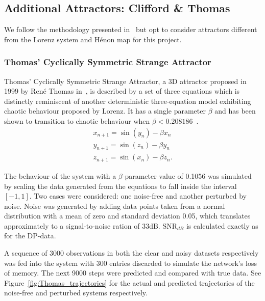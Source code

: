  

\subsection{Additional Attractors: Clifford \& Thomas}
We follow the methodology presented in~\cite{manjunath2021universal} but opt to consider attractors different from the Lorenz system and H\'enon map for this project.

\subsubsection{Thomas' Cyclically Symmetric Strange Attractor}\label{Thomas_Attractor}
Thomas' Cyclically Symmetric Strange Attractor, a 3D attractor proposed in 1999 by Ren\'e Thomas in~\cite{ThomasAttractor}, is described by a set of three equations which is distinctly reminiscent of another deterministic three-equation model exhibiting chaotic behaviour proposed by Lorenz. 
It has a single parameter $\beta$ and has been shown to transition to chaotic behaviour when $\beta<0.208186$~\cite{Thomas_BetaParameter}.
\begin{eqnarray}\label{eqns_thomas}
  x_{n+1} = \sin(y_n) - \beta{x_n} \\
  y_{n+1} = \sin(z_n) - \beta{y_n} \\
  z_{n+1} = \sin(x_n) - \beta{z_n}.
\end{eqnarray}

The behaviour of the system with a $\beta$-parameter value of 0.1056 was simulated by scaling the data generated from the equations to fall inside the interval $[-1,1]$. Two cases were considered: one noise-free and another perturbed by noise. 
Noise was generated  by adding data points taken from a normal distribution with a mean of zero and standard deviation 0.05, which translates approximately to a signal-to-noise ration of 33dB. 
$\text{SNR}_{dB}$ is calculated exactly as for the DP-data.

A sequence of 3000 observations in both the clear and noisy datasets respectively was fed into the system with 300 entries discarded to simulate the network's loss of memory. 
The next 9000 steps were predicted and compared with true data. See Figure~\ref{fig:Thomas_trajectories} for the actual and predicted trajectories of the noise-free and perturbed systems respectively. 

